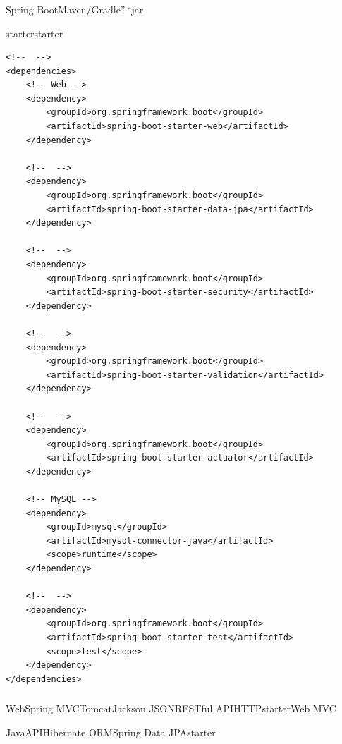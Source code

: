 \hypertarget{section-31}{%
\subsubsection{}\label{section-31}}

Spring BootMaven/Gradle''\,``jar

\important{}starter\important{}\important{}\important{}starter

\begin{lstlisting}[style=xml]
<!--  -->
<dependencies>
    <!-- Web -->
    <dependency>
        <groupId>org.springframework.boot</groupId>
        <artifactId>spring-boot-starter-web</artifactId>
    </dependency>
    
    <!--  -->
    <dependency>
        <groupId>org.springframework.boot</groupId>
        <artifactId>spring-boot-starter-data-jpa</artifactId>
    </dependency>
    
    <!--  -->
    <dependency>
        <groupId>org.springframework.boot</groupId>
        <artifactId>spring-boot-starter-security</artifactId>
    </dependency>
    
    <!--  -->
    <dependency>
        <groupId>org.springframework.boot</groupId>
        <artifactId>spring-boot-starter-validation</artifactId>
    </dependency>
    
    <!--  -->
    <dependency>
        <groupId>org.springframework.boot</groupId>
        <artifactId>spring-boot-starter-actuator</artifactId>
    </dependency>
    
    <!-- MySQL -->
    <dependency>
        <groupId>mysql</groupId>
        <artifactId>mysql-connector-java</artifactId>
        <scope>runtime</scope>
    </dependency>
    
    <!--  -->
    <dependency>
        <groupId>org.springframework.boot</groupId>
        <artifactId>spring-boot-starter-test</artifactId>
        <scope>test</scope>
    </dependency>
</dependencies>
\end{lstlisting}

\hypertarget{section-32}{%
\subsubsection{}\label{section-32}}

WebSpring MVCTomcatJackson
JSONRESTful APIHTTPstarterWeb MVC

JavaAPIHibernate ORMSpring Data
JPAstarter

